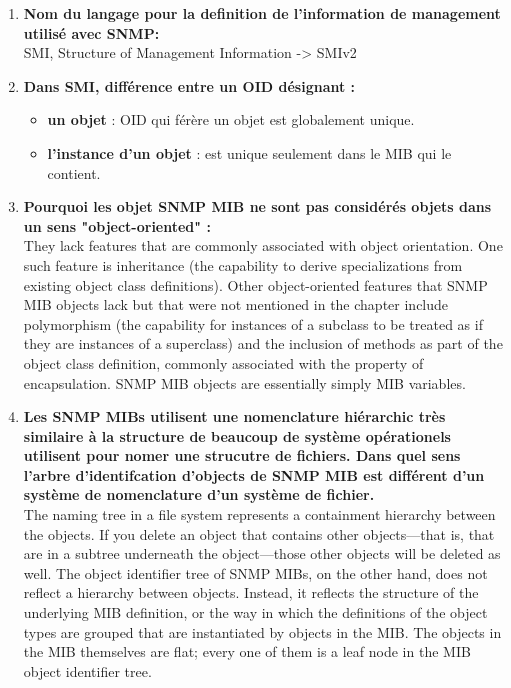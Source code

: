 \documentclass[12pt,landscape]{article}
\begin{document}
\begin{multicols}{2}
\begin{enumerate}
\item \textbf{Nom du langage pour la definition de l'information de management utilisé avec SNMP:}\\
SMI, Structure of Management Information -> SMIv2

\item \textbf{Dans SMI, différence entre un OID désignant :}\\
\begin{itemize}
\item \textbf{un objet} : OID qui férère un objet est globalement unique.
\item \textbf{l'instance d'un objet} : est unique seulement dans le MIB qui le contient.
\end{itemize}

\item \textbf{Pourquoi les objet SNMP MIB ne sont pas considérés objets dans un sens "object-oriented" :}\\
They lack features that are commonly associated with object orientation. One such
feature is inheritance (the capability to derive specializations from existing object class
definitions). Other object-oriented features that SNMP MIB objects lack but that were not
mentioned in the chapter include polymorphism (the capability for instances of a subclass to
be treated as if they are instances of a superclass) and the inclusion of methods as part of the
object class definition, commonly associated with the property of encapsulation. SNMP MIB
objects are essentially simply MIB variables.

\item \textbf{Les SNMP MIBs utilisent une nomenclature hiérarchic très similaire à la structure de beaucoup de système opérationels utilisent pour nomer une strucutre de fichiers. Dans quel sens l'arbre d'identifcation d'objects de SNMP MIB est différent d'un système de nomenclature d'un système de fichier.}\\
The naming tree in a file system represents a containment hierarchy between the
objects. If you delete an object that contains other objects—that is, that are in a subtree
underneath the object—those other objects will be deleted as well. The object identifier tree
of SNMP MIBs, on the other hand, does not reflect a hierarchy between objects. Instead, it
reflects the structure of the underlying MIB definition, or the way in which the definitions of
the object types are grouped that are instantiated by objects in the MIB. The objects in the
MIB themselves are flat; every one of them is a leaf node in the MIB object identifier tree.


\end{enumerate}
\end{multicols}
\end{document}
